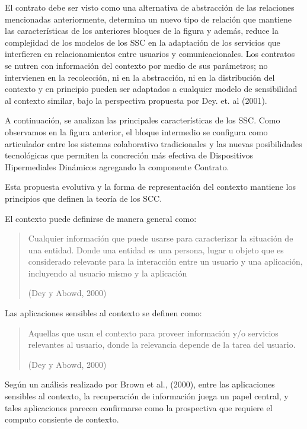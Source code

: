 El contrato debe ser visto como una alternativa de abstracción de las relaciones
mencionadas anteriormente, determina un nuevo tipo de relación que mantiene las
características de los anteriores bloques de la figura y además, reduce la
complejidad de
los modelos de los SSC en la adaptación de los servicios que interfieren
en
relacionamientos entre usuarios y comunicacionales. Los contratos se nutren con
información del contexto por medio de sus parámetros; no intervienen en la
recolección,
ni en la abstracción, ni en la distribución del contexto y en principio pueden
ser
adaptados a cualquier modelo de sensibilidad al contexto similar, bajo la
perspectiva propuesta por Dey. et. al (2001).


A continuación, se analizan las principales características de los
SSC.
Como observamos en la figura anterior, el bloque intermedio se configura como
articulador entre los sistemas colaborativo tradicionales y las
nuevas posibilidades
tecnológicas que permiten la concreción más efectiva de Dispositivos
Hipermediales
Dinámicos agregando la componente Contrato.

Esta propuesta evolutiva y la forma de representación del contexto mantiene
los principios que definen la teoría de los SCC.

El contexto puede definirse de manera general como:

\begin{quote}
Cualquier información que puede usarse para caracterizar la situación de
una entidad. Donde una entidad es una persona, lugar u objeto que es
considerado relevante para la interacción entre un usuario y una
aplicación, incluyendo al usuario mismo y la aplicación
\begin{flushright}(Dey y Abowd, 2000)\end{flushright}
\end{quote}  


Las aplicaciones sensibles al contexto se definen  como:


\begin{quote}
Aquellas que usan el contexto para proveer información y/o servicios
relevantes al usuario, donde la relevancia depende de la tarea del usuario.
\begin{flushright}(Dey y Abowd, 2000)\end{flushright}
\end{quote}

Según un análisis realizado por Brown et al., (2000), entre las aplicaciones
sensibles al contexto, la recuperación de información juega un papel
central, y
tales aplicaciones parecen confirmarse como la prospectiva que requiere el
computo consiente de contexto.


